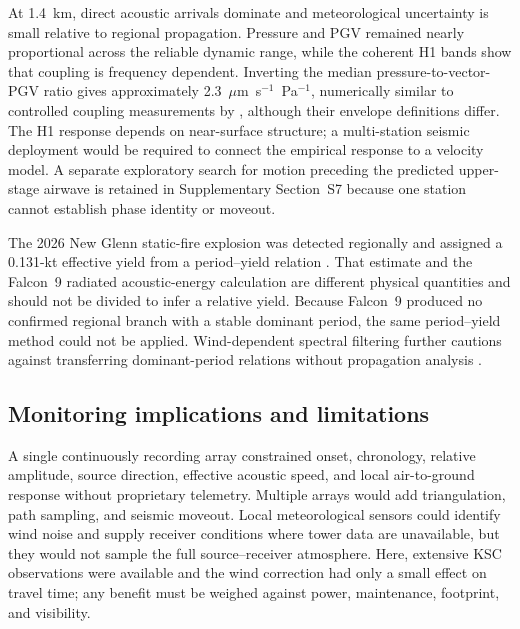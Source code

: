 \documentclass[]{seismica}
\begin{document}
At 1.4~km, direct acoustic arrivals dominate and meteorological uncertainty is
small relative to regional propagation. Pressure and PGV remained nearly
proportional across the reliable dynamic range, while the coherent H1 bands
show that coupling is frequency dependent. Inverting the median pressure-to-vector-PGV ratio gives approximately
2.3~$\mu$m~s$^{-1}$~Pa$^{-1}$, numerically similar to controlled coupling
measurements by \citet{novoselov_ground_coupling_2020}, although their envelope
definitions differ. The H1 response depends on near-surface structure; a
multi-station seismic deployment would be required to connect the empirical
response to a velocity model. A separate exploratory search for motion
preceding the predicted upper-stage airwave is retained in Supplementary
Section~S7 because one station cannot establish phase identity or moveout.

The 2026 New Glenn static-fire explosion was detected regionally and assigned
a 0.131-kt effective yield from a period--yield relation
\citep{silber_scamfer_newglenn_2026}. That estimate and the Falcon~9 radiated
acoustic-energy calculation are different physical quantities and should not
be divided to infer a relative yield. Because Falcon~9 produced no confirmed
regional branch with a stable dominant period, the same period--yield method
could not be applied. Wind-dependent spectral filtering further cautions
against transferring dominant-period relations without propagation analysis
\citep{silber_wind_filtering_2026}.

\subsection{Monitoring implications and limitations}

A single continuously recording array constrained onset, chronology, relative
amplitude, source direction, effective acoustic speed, and local air-to-ground
response without proprietary telemetry. Multiple arrays would add
triangulation, path sampling, and seismic moveout. Local meteorological sensors
could identify wind noise and supply receiver conditions where tower data are
unavailable, but they would not sample the full source--receiver atmosphere.
Here, extensive KSC observations were available and the wind correction had
only a small effect on travel time; any benefit must be weighed against power,
maintenance, footprint, and visibility.
\end{document}

